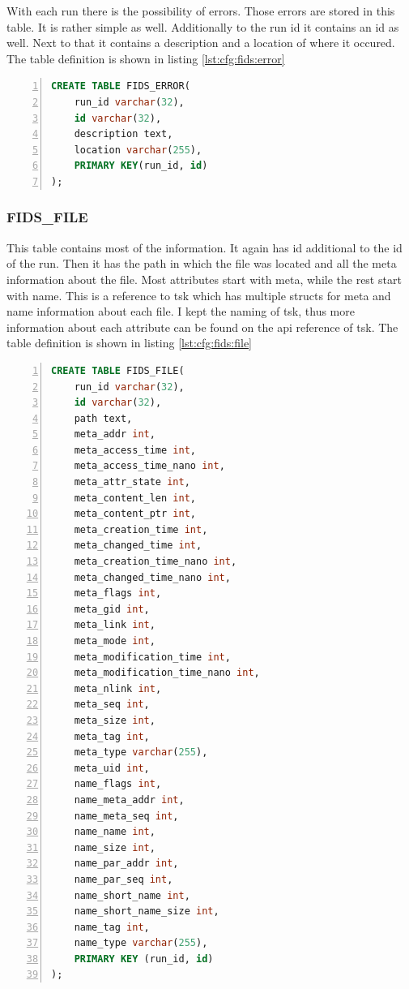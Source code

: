 \documentclass[
	a4paper,					%
	10pt,							%
	twoside,					%
	openright,				%
	notitlepage,			%
	parskip=half,			%
]{scrreprt}					%
\begin{document}
With each run there is the possibility of errors. Those errors are stored in this table. It is rather simple as well. Additionally to the run \gls{id} it contains an \gls{id} as well. Next to that it contains a description and a location of where it occured. The table definition is shown in listing \ref{lst:cfg:fids:error}

\begin{lstlisting}[language=sql, numbers=left, caption=Fids Error Table Definition, label=lst:cfg:fids:error]
CREATE TABLE FIDS_ERROR(
	run_id varchar(32), 
	id varchar(32), 
	description text, 
	location varchar(255), 
	PRIMARY KEY(run_id, id)
);
\end{lstlisting}

\subsubsection{FIDS\_FILE}

This table contains most of the information. It again has \gls{id} additional to the \gls{id} of the run. Then it has the path in which the file was located and all the meta information about the file. Most attributes start with meta, while the rest start with name. This is a reference to \gls{tsk} which has multiple structs for meta and name information about each file. I kept the naming of \gls{tsk}, thus more information about each attribute can be found on the \gls{api} reference of \gls{tsk}. \cite{tsk:file:struct} The table definition is shown in listing \ref{lst:cfg:fids:file}

\begin{lstlisting}[language=sql, numbers=left, caption=Fids File Table Definition, label=lst:cfg:fids:file]
CREATE TABLE FIDS_FILE(
	run_id varchar(32),
	id varchar(32),
	path text, 
	meta_addr int,
	meta_access_time int,
	meta_access_time_nano int,
	meta_attr_state int,
	meta_content_len int,
	meta_content_ptr int,
	meta_creation_time int,
	meta_changed_time int,
	meta_creation_time_nano int,
	meta_changed_time_nano int,
	meta_flags int,
	meta_gid int,
	meta_link int,
	meta_mode int,
	meta_modification_time int,
	meta_modification_time_nano int,
	meta_nlink int,
	meta_seq int,
	meta_size int,
	meta_tag int,
	meta_type varchar(255),
	meta_uid int,
	name_flags int,
	name_meta_addr int,
	name_meta_seq int,
	name_name int,
	name_size int,
	name_par_addr int,
	name_par_seq int,
	name_short_name int,
	name_short_name_size int,
	name_tag int,
	name_type varchar(255),
	PRIMARY KEY (run_id, id)
);
\end{lstlisting}
\end{document}
